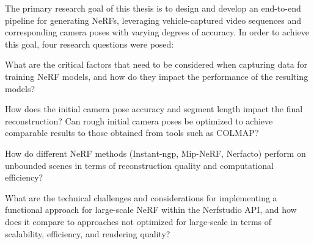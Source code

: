 The primary research goal of this thesis is to design and develop an end-to-end pipeline for generating NeRFs, leveraging vehicle-captured video sequences and corresponding camera poses with varying degrees of accuracy. In order to achieve this goal, four research questions were posed:


\begin{description}[leftmargin=!,labelwidth=\widthof{RQ 1:}]
\item[\textbf{RQ 1:}] What are the critical factors that need to be considered when capturing data for training NeRF models, and how do they impact the performance of the resulting models?

\item[\textbf{RQ 2:}] How does the initial camera pose accuracy and segment length impact the final reconstruction? Can rough initial camera poses be optimized to achieve comparable results to those obtained from tools such as COLMAP?

\item[\textbf{RQ 3:}] How do different NeRF methods (Instant-ngp\cite{mullerInstantNeuralGraphics2022}, Mip-NeRF\cite{barronMipNeRFMultiscaleRepresentation2021}, Nerfacto\cite{tancik_nerfstudio_2023}) perform on unbounded scenes in terms of reconstruction quality and computational efficiency?

\item[\textbf{RQ 4:}] What are the technical challenges and considerations for implementing a functional approach for large-scale NeRF within the Nerfstudio API, and how does it compare to approaches not optimized for large-scale in terms of scalability, efficiency, and rendering quality?


\end{description}

\begin{comment}
The research goal for this thesis is:
\begin{description}[leftmargin=!,labelwidth=\widthof{RQ:}]
\item[\textbf{RG:}] Design and develop an end-to-end pipeline for generating NeRFs, leveraging vehicle-captured video sequences and corresponding camera poses with varying degrees of accuracy.
\end{description}

In order to achieve this goal, four research questions were posed:
\end{comment}




